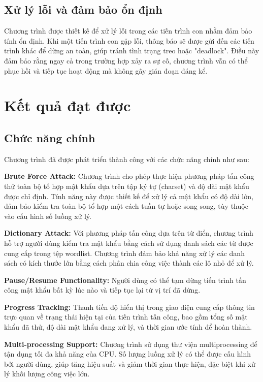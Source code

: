 \documentclass[../DoAn.tex]{subfiles}
\begin{document}
\subsection{Xử lý lỗi và đảm bảo ổn định}

Chương trình được thiết kế để xử lý lỗi trong các tiến trình con nhằm đảm bảo tính ổn định. Khi một tiến trình con gặp lỗi, thông báo sẽ được gửi đến các tiến trình khác để dừng an toàn, giúp tránh tình trạng treo hoặc "deadlock". Điều này đảm bảo rằng ngay cả trong trường hợp xảy ra sự cố, chương trình vẫn có thể phục hồi và tiếp tục hoạt động mà không gây gián đoạn đáng kể.

\section{Kết quả đạt được}

\subsection{Chức năng chính}
Chương trình đã được phát triển thành công với các chức năng chính như sau:

\textbf{Brute Force Attack:}
Chương trình cho phép thực hiện phương pháp tấn công thử toàn bộ tổ hợp mật khẩu dựa trên tập ký tự (charset) và độ dài mật khẩu được chỉ định. Tính năng này được thiết kế để xử lý cả mật khẩu có độ dài lớn, đảm bảo kiểm tra toàn bộ tổ hợp một cách tuần tự hoặc song song, tùy thuộc vào cấu hình số luồng xử lý.

\textbf{Dictionary Attack:}
Với phương pháp tấn công dựa trên từ điển, chương trình hỗ trợ người dùng kiểm tra mật khẩu bằng cách sử dụng danh sách các từ được cung cấp trong tệp wordlist. Chương trình đảm bảo khả năng xử lý các danh sách có kích thước lớn bằng cách phân chia công việc thành các lô nhỏ để xử lý.

\textbf{Pause/Resume Functionality:}
Người dùng có thể tạm dừng tiến trình tấn công mật khẩu bất kỳ lúc nào và tiếp tục lại từ vị trí đã dừng. 

\textbf{Progress Tracking:}
Thanh tiến độ hiển thị trong giao diện cung cấp thông tin trực quan về trạng thái hiện tại của tiến trình tấn công, bao gồm tổng số mật khẩu đã thử, độ dài mật khẩu đang xử lý, và thời gian ước tính để hoàn thành.

\textbf{Multi-processing Support:}
Chương trình sử dụng thư viện multiprocessing để tận dụng tối đa khả năng của CPU. Số lượng luồng xử lý có thể được cấu hình bởi người dùng, giúp tăng hiệu suất và giảm thời gian thực hiện, đặc biệt khi xử lý khối lượng công việc lớn.
\end{document}
